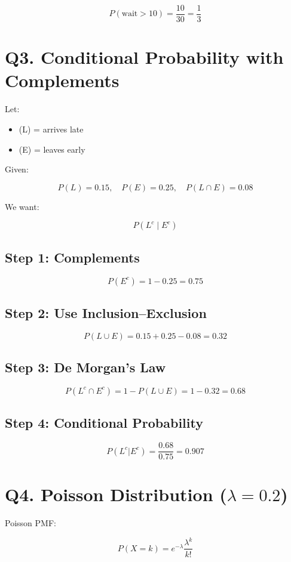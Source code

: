 \documentclass[12pt]{article}
\begin{document}
\[
P(\text{wait} > 10) = \frac{10}{30} = \frac{1}{3}
\]

\section*{Q3. Conditional Probability with Complements}

Let:

\begin{itemize}
    \item (L) = arrives late
    \item (E) = leaves early
\end{itemize}

Given:

\[
P(L)=0.15,\quad P(E)=0.25,\quad P(L\cap E)=0.08
\]

We want:

\[
P(L^c \mid E^c)
\]

\subsection*{Step 1: Complements}

\[
P(E^c)=1-0.25=0.75
\]

\subsection*{Step 2: Use Inclusion--Exclusion}

\[
P(L\cup E)=0.15+0.25-0.08=0.32
\]

\subsection*{Step 3: De Morgan’s Law}

\[
P(L^c \cap E^c)=1-P(L\cup E)=1-0.32=0.68
\]

\subsection*{Step 4: Conditional Probability}

\[
P(L^c|E^c)=\frac{0.68}{0.75}=0.907
\]

\section*{Q4. Poisson Distribution ($\lambda = 0.2$)}

Poisson PMF:

\[
P(X=k)=e^{-\lambda}\frac{\lambda^k}{k!}
\]
\end{document}
